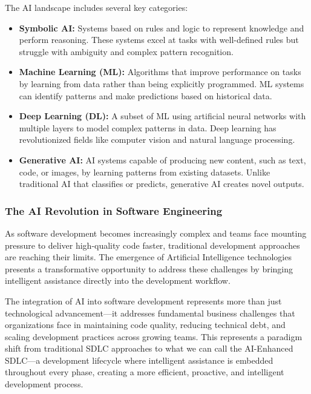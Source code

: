 \begin{spacing}{1.2}
The AI landscape includes several key categories:

\begin{itemize}
    \item \textbf{Symbolic AI:} Systems based on rules and logic to represent knowledge and perform reasoning. These systems excel at tasks with well-defined rules but struggle with ambiguity and complex pattern recognition.
    
    \item \textbf{Machine Learning (ML):} Algorithms that improve performance on tasks by learning from data rather than being explicitly programmed. ML systems can identify patterns and make predictions based on historical data.
    
    \item \textbf{Deep Learning (DL):} A subset of ML using artificial neural networks with multiple layers to model complex patterns in data. Deep learning has revolutionized fields like computer vision and natural language processing.
    
    \item \textbf{Generative AI:} AI systems capable of producing new content, such as text, code, or images, by learning patterns from existing datasets. Unlike traditional AI that classifies or predicts, generative AI creates novel outputs.
\end{itemize}

\subsubsection*{The AI Revolution in Software Engineering}
As software development becomes increasingly complex and teams face mounting pressure to deliver high-quality code faster, traditional development approaches are reaching their limits. The emergence of Artificial Intelligence technologies presents a transformative opportunity to address these challenges by bringing intelligent assistance directly into the development workflow.

The integration of AI into software development represents more than just technological advancement—it addresses fundamental business challenges that organizations face in maintaining code quality, reducing technical debt, and scaling development practices across growing teams. This represents a paradigm shift from traditional SDLC approaches to what we can call the AI-Enhanced SDLC—a development lifecycle where intelligent assistance is embedded throughout every phase, creating a more efficient, proactive, and intelligent development process.


\end{spacing}
